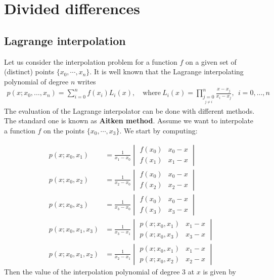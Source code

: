 
\chapter{Divided differences}
\label{ch:approximation-divided}
\section{Lagrange interpolation}
\noindent
Let us consider the interpolation problem for a function $f$ on a given set of (distinct) points $\{ x_0, \cdots,x_n\}$. It is well known that the Lagrange interpolating polynomial of degree $n$ writes
\begin{align}
  p(x; x_0, \ldots, x_n) = \sum\limits_{i=0}^n f(x_i) L_i(x), \quad \mbox{where}~ L_i(x) = \prod\limits_{\underset{j \neq i}{j=0}}^n \frac{x-x_j}{x_i-x_j}, ~~ i = 0, \ldots, n
  \label{eq:lagrange-interpolation}
\end{align}
The evaluation of the Lagrange interpolator can be done with different methods. The standard one is known as \textbf{Aitken method}. Assume we want to interpolate a function $f$ on the points $\{ x_0, \cdots, x_3 \}$. We start by computing:

\begin{align*}
  p(x; x_0, x_1) &= \frac{1}{x_1-x_0} \begin{vmatrix}f(x_0) & x_0 - x \\ f(x_1) & x_1 - x \end{vmatrix}
  \\
  p(x; x_0, x_2) &= \frac{1}{x_2-x_0} \begin{vmatrix}f(x_0) & x_0 - x \\ f(x_2) & x_2 - x \end{vmatrix}
  \\
  p(x; x_0, x_3) &= \frac{1}{x_3-x_0} \begin{vmatrix}f(x_0) & x_0 - x \\ f(x_3) & x_3 - x \end{vmatrix}
  \\
  p(x; x_0, x_1, x_3) &= \frac{1}{x_3-x_1} \begin{vmatrix}p(x; x_0, x_1) & x_1 - x \\ p(x; x_0, x_3) & x_3 - x \end{vmatrix}
  \\
  p(x; x_0, x_1, x_2) &= \frac{1}{x_2-x_1} \begin{vmatrix}p(x; x_0, x_1) & x_1 - x \\ p(x; x_0, x_2) & x_2 - x \end{vmatrix}
\end{align*}
Then the value of the interpolation polynomial of degree $3$ at $x$ is given by

